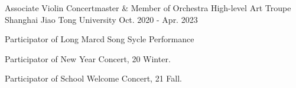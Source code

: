 \begin{cventries}
    \cventry
    {Associate Violin Concertmaster \& Member of Orchestra}
    {High-level Art Troupe} %
    {Shanghai Jiao Tong University} %
    {Oct. 2020 - Apr. 2023} %
    {
      \begin{cvitems} %
      \item Participator of Long Marcd Song Sycle Performance
      \item Participator of New Year Concert, 20 Winter.
      \item Participator of School Welcome Concert, 21 Fall.
      \end{cvitems}
    }
    
    

\end{cventries}
